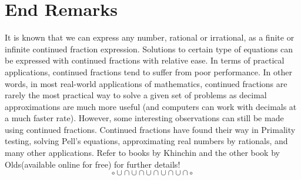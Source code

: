 \documentclass[12pt]{amsart}
\theoremstyle{definition}
\theoremstyle{remark}
\numberwithin{equation}{section}
\begin{document}
\section{End Remarks}
It is known that we can express any number, rational or irrational, as a finite or infinite continued fraction expression. Solutions to certain type of equations can be expressed with continued fractions with relative ease. In terms of practical applications, continued fractions tend to suffer from poor performance. In other words, in most real-world applications of mathematics, continued fractions are rarely the most practical way to solve a given set of problems as decimal approximations are much more useful (and computers can work with decimals at a much faster rate). However, some interesting observations can still be made using continued fractions. Continued fractions have found their way in Primality testing, solving Pell's equations, approximating real numbers by rationals, and many other applications. Refer to books by Khinchin and the other book by Olds(available online for free) for further details! 
$$\circ\cup\cap\cup\cap\cup\cap\cup\cap\cup\cap \circ$$
\end{document}
